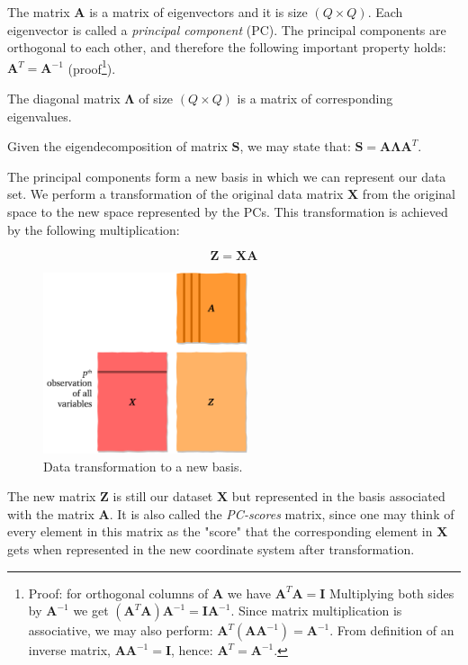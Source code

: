 \documentclass[10pt,twocolumn]{article}
\begin{document}
The matrix $\bm{A}$ is a matrix of eigenvectors and it is size $(Q \times Q)$. Each eigenvector is called a \textit{principal component} (PC). The principal components are orthogonal to each other, and therefore the following important property holds: $\bm{A}^T = \bm{A}^{-1}$ (proof\footnote{Proof: for orthogonal columns of $\bm{A}$ we have $\bm{A}^T \bm{A} = \bm{I}$ Multiplying both sides by $\bm{A}^{-1}$ we get $(\bm{A}^T \bm{A}) \bm{A}^{-1}= \bm{I}\bm{A}^{-1}$. Since matrix multiplication is associative, we may also perform: $\bm{A}^T (\bm{A} \bm{A}^{-1}) = \bm{A}^{-1}$. From definition of an inverse matrix,  $\bm{A} \bm{A}^{-1} = \bm{I}$, hence: $\bm{A}^T = \bm{A}^{-1}$.}).

The diagonal matrix $\bm{\Lambda}$ of size $(Q \times Q)$ is a matrix of corresponding eigenvalues.

Given the eigendecomposition of matrix $\bm{S}$, we may state that: $\bm{S} = \bm{A} \bm{\Lambda} \bm{A}^T$.

The principal components form a new basis in which we can represent our data set. We perform a transformation of the original data matrix $\bm{X}$ from the original space to the new space represented by the PCs. This transformation is achieved by the following multiplication:

\begin{equation} \label{eq:data-transform}
\bm{Z} = \bm{X} \bm{A}
\end{equation}

\begin{figure}[H]
\centering\includegraphics[width=6cm]{data-transformation.png}
\caption{Data transformation to a new basis.}
\label{fig:data-transformation}
\end{figure}

The new matrix $\bm{Z}$ is still our dataset $\bm{X}$ but represented in the basis associated with the matrix $\bm{A}$. It is also called the \textit{PC-scores} matrix, since one may think of every element in this matrix as the "score" that the corresponding element in $\bm{X}$ gets when represented in the new coordinate system after transformation.
\end{document}
